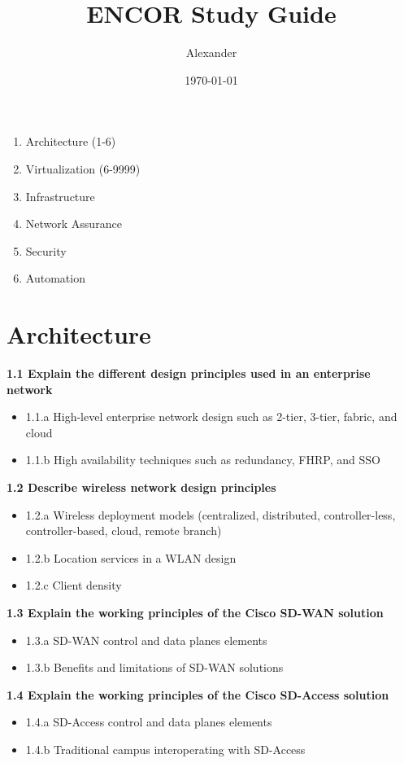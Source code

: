 \documentclass{article}
\title{ENCOR Study Guide}
\author{Alexander}
\date{\today}
\begin{document}
\maketitle

\begin{enumerate}
\item Architecture (1-6)
\item Virtualization (6-9999)
\item Infrastructure
\item Network Assurance
\item Security
\item Automation
\end{enumerate}

\section{Architecture}
\textbf{1.1 Explain the different design principles used in an enterprise network}
\begin{itemize}
\item 1.1.a High-level enterprise network design such as 2-tier, 3-tier, fabric, and cloud
\item 1.1.b High availability techniques such as redundancy, FHRP, and SSO
\end{itemize}

\noindent\textbf{1.2 Describe wireless network design principles}
\begin{itemize}
\item 1.2.a Wireless deployment models (centralized, distributed, controller-less, controller-based, cloud, remote branch)
\item 1.2.b Location services in a WLAN design
\item 1.2.c Client density
\end{itemize}

\noindent\textbf{1.3 Explain the working principles of the Cisco SD-WAN solution}
\begin{itemize}
\item 1.3.a SD-WAN control and data planes elements
\item 1.3.b Benefits and limitations of SD-WAN solutions
\end{itemize}

\noindent\textbf{1.4 Explain the working principles of the Cisco SD-Access solution}
\begin{itemize}
\item 1.4.a SD-Access control and data planes elements
\item 1.4.b Traditional campus interoperating with SD-Access
\end{itemize}
\end{document}
